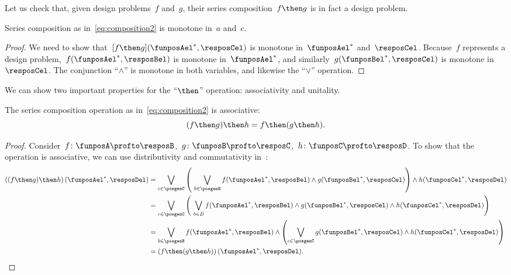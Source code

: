 Let us check that, given design problems~$f$ and~$g$, their series composition~$f\then g$ is in fact a design problem.
\begin{lemma}
  Series composition as in~\cref{eq:composition2} is monotone in~$a$ and~$c$.
\end{lemma}
\begin{proof}
  We need to show that~$[f\then g](\funposAel^*,\resposCel)$ is monotone in~$\funposAel^*$ and~$\resposCel$. Because~$f$ represents a design problem,~$f(\funposAel^*,\resposBel)$ is monotone in~$\funposAel^*$, and similarly~$g(\funposBel^*,\resposCel)$ is monotone in~$\resposCel$. The conjunction ``$\wedge$'' is monotone in both variables, and likewise the ``$\vee$'' operation.
\end{proof}

We can show two important properties for the ``$\then$'' operation: associativity and unitality.
\begin{lemma}
  The series composition operation as in~\cref{eq:composition2} is associative:
  \begin{equation}
  (f\then g)
    \then h = f\then (g\then h).
  \end{equation}
\end{lemma}


\begin{proof}
  Consider~$f\colon \funposA\profto \resposB$,~$g\colon \funposB \profto \resposC$,~$h\colon \funposC\profto \resposD$.
  To show that the operation is associative, we can use distributivity and commutativity in~\Bool:
%
  \begin{equation}
    \label{eq:dp_associativity}
    \begin{aligned}
      \left((f\then g) \then h\right) (\funposAel^*,\resposDel)
      &= \bigvee_{c \in \posgenC} \left (\ \bigvee_{b\in \posgenB} f(\funposAel^*,\resposBel) \wedge g(\funposBel^*,\resposCel) \right )  \wedge  h (\funposCel^*, \resposDel) \\
      &= \bigvee_{c \in \posgenC} \left (\ \bigvee_{b\in B } f(\funposAel^*,\resposBel)
      \wedge g(\funposBel^*,\resposCel) \wedge h (\funposCel^*, \resposDel)
      \right ) \\
      &= \bigvee_{b \in \posgenB } f(\funposAel^*,\resposBel) \wedge \left ( \bigvee_{c\in \posgenC} g(\funposBel^*,\resposCel) \wedge h (\funposCel^*, \resposDel) \right ) \\
      &= \left(f \then (g \then h )\right) (\funposAel^*, \resposDel).
    \end{aligned}
  \end{equation}
%
\end{proof}

